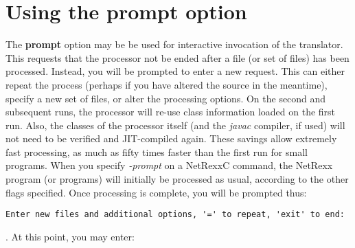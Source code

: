 \chapter{Using the prompt option}
The \textbf{prompt} option may be be used for interactive invocation of
the translator. This requests that the processor not be ended after a
file (or set of files) has been processed.  Instead, you will be
prompted to enter a new request.  This can either repeat the process
(perhaps if you have altered the source in the meantime), specify a new
set of files, or alter the processing options.
\newline
On the second and subsequent runs, the processor will re-use class
information loaded on the first run.  Also, the classes of the processor
itself (and the \emph{javac} compiler, if used) will not need to be
verified and JIT-compiled again.  These savings allow extremely fast
processing, as much as fifty times faster than the first run for small
programs.
\newline
When you specify \emph{-prompt} on a NetRexxC command, the NetRexx
program (or programs) will initially be processed as usual, according to
the other flags specified.  Once processing is complete, you will be
prompted thus:
\begin{verbatim}
Enter new files and additional options, '=' to repeat, 'exit' to end:
\end{verbatim}.
\newline
At this point, you may enter:
